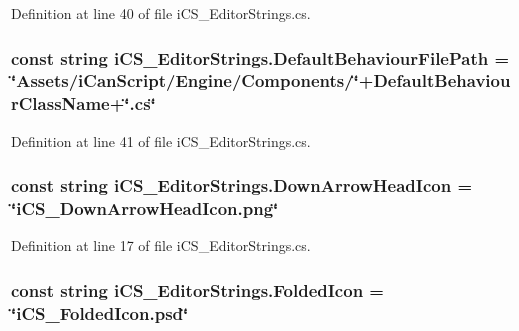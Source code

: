 Definition at line 40 of file i\+C\+S\+\_\+\+Editor\+Strings.\+cs.

\hypertarget{classi_c_s___editor_strings_ac83b59617aa70de7db7c48c22db48fa6}{
\subsubsection[{Default\+Behaviour\+File\+Path}]{\setlength{\rightskip}{0pt plus 5cm}const string i\+C\+S\+\_\+\+Editor\+Strings.\+Default\+Behaviour\+File\+Path = \char`\"{}Assets/{\bf i\+Can\+Script}/Engine/Components/\char`\"{}+Default\+Behaviour\+Class\+Name+\char`\"{}.cs\char`\"{}}}\label{classi_c_s___editor_strings_ac83b59617aa70de7db7c48c22db48fa6}


Definition at line 41 of file i\+C\+S\+\_\+\+Editor\+Strings.\+cs.

\hypertarget{classi_c_s___editor_strings_a980e77f75ffa63337ecb15b9594510e7}{
\subsubsection[{Down\+Arrow\+Head\+Icon}]{\setlength{\rightskip}{0pt plus 5cm}const string i\+C\+S\+\_\+\+Editor\+Strings.\+Down\+Arrow\+Head\+Icon = \char`\"{}i\+C\+S\+\_\+\+Down\+Arrow\+Head\+Icon.\+png\char`\"{}}}\label{classi_c_s___editor_strings_a980e77f75ffa63337ecb15b9594510e7}


Definition at line 17 of file i\+C\+S\+\_\+\+Editor\+Strings.\+cs.

\hypertarget{classi_c_s___editor_strings_a9b51142c4a7744da8796445b9797575c}{
\subsubsection[{Folded\+Icon}]{\setlength{\rightskip}{0pt plus 5cm}const string i\+C\+S\+\_\+\+Editor\+Strings.\+Folded\+Icon = \char`\"{}i\+C\+S\+\_\+\+Folded\+Icon.\+psd\char`\"{}}}\label{classi_c_s___editor_strings_a9b51142c4a7744da8796445b9797575c}


